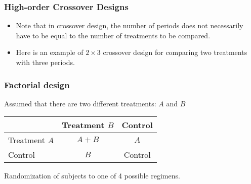 \documentclass[table,10pt]{beamer}
\begin{document}
\begin{CJK*}{UTF8}{gbsn}
\begin{frame}[t]
\frametitle{High-order Crossover Designs}
\begin{itemize}
	\item Note that in crossover design, the number of periods does not necessarily have to be 
		equal to the number of treatments to be compared.
	\item Here is an example of $2 \times 3$ crossover design for comparing two treatments with 
		three periods.
\end{itemize}
\end{frame}

\begin{frame}[t]
\frametitle{Factorial design}
Assumed that there are two different treatments: $A$ and $B$
\begin{table}
\begin{tabular}{lcc}
& Treatment $B$ & Control\\
\hline
Treatment $A$ & $A+B$ & $A$\\
\hline
Control & $B$ & Control\\
\hline
\end{tabular}
\end{table}
Randomization of subjects to one of 4 possible regimens.


\end{frame}
\end{CJK*}
\end{document}
